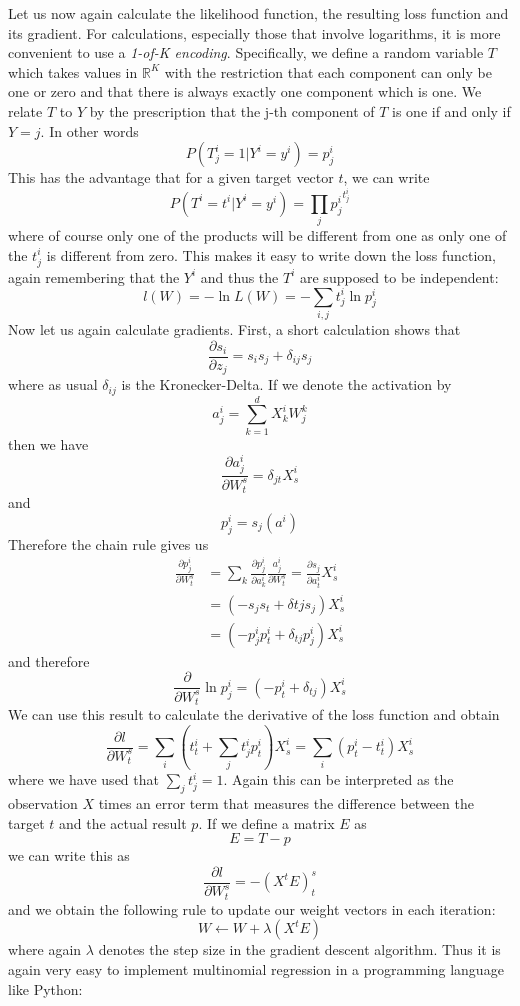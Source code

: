 \documentclass[a4paper, draft]{report}
\numberwithin{section}{chapter}
\numberwithin{equation}{chapter}
\theoremstyle{own}
\theoremstyle{remark}
\newcommand{\R}{\mathbb{R}}
\begin{document}
Let us now again calculate the likelihood function, the resulting loss function and its gradient. For calculations, especially those that involve logarithms, it is more convenient to use a {\em 1-of-K encoding}. Specifically, we define a random variable $T$ which takes values in $\R^K$ with the restriction that each component can only be one or zero and that there is always exactly one component which is one. We relate $T$ to $Y$ by the prescription that the j-th component of $T$ is one if and only if $Y=j$. In other words
$$
P(T^i_j = 1  | Y^i = y^i) = p^i_j 
$$
This has the advantage that for a given target vector $t$, we can write
$$
P(T^i = t^i | Y^i = y^i) = \prod_j {p^i_j}^{t^i_j} 
$$
where of course only one of the products will be different from one as only one of the $t^i_j$ is different from zero. This makes it easy to write down the loss function, again remembering that the $Y^i$ and thus the $T^i$ are supposed to be independent:
$$
l(W) = - \ln L(W) = - \sum_{i,j} t^i_j \ln p^i_j
$$
Now let us again calculate gradients. First, a short calculation shows that
$$
\frac{\partial s_i}{\partial z_j} =  s_i s_j + \delta_{ij} s_j
$$
where as usual $\delta_{ij}$ is the Kronecker-Delta. If we denote the activation by
$$
a^i_j = \sum_{k=1}^d X^i_k W^k_j
$$
then we have
$$
\frac{\partial a^i_j}{\partial W^s_t} = \delta_{jt} X^i_s
$$
and
$$
p^i_j = s_j (a^i)
$$
Therefore the chain rule gives us
\begin{align*}
\frac{\partial p^i_j}{\partial W^s_t} &= \sum_k \frac{\partial p^i_j}{\partial a^i_k} \frac{a^i_j}{\partial W^s_t}   
=\frac{\partial s_j}{\partial a^i_t} X^i_s \\
&= (-s_j s_t  + \delta{tj} s_j) X^i_s \\
&= (-p^i_j p^i_t + \delta_{tj} p^i_j) X^i_s
\end{align*}
and therefore
$$
\frac{\partial}{\partial W^s_t} \ln p^i_j = (-p^i_t + \delta_{tj})X^i_s
$$
We can use this result to calculate the derivative of the loss function and obtain
$$
\frac{\partial l}{\partial W^s_t} = \sum_i (t^i_t + \sum_j t^i_j p^i_t) X^i_s = \sum_i (p^i_t - t^i_t) X^i_s
$$
where we have used that $\sum_j t^i_j = 1$. Again this can be interpreted as the observation $X$ times an error term that measures the difference between the target $t$ and the actual result $p$. If we define a matrix $E$ as
$$
E = T - p
$$ 
we can write this as
$$
\frac{ \partial l}{\partial W^s_t} = - (X^t E)^s_t
$$
and we obtain the following rule to update our weight vectors in each iteration:
$$
W \leftarrow W + \lambda (X^t E)
$$
where again $\lambda$ denotes the step size in the gradient descent algorithm. Thus it is again very easy to implement multinomial regression in a programming language like Python:
\end{document}
